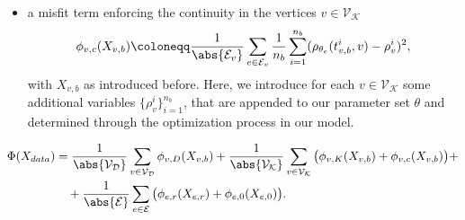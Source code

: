 \begin{itemize}
    \item a misfit term enforcing the continuity in the vertices $v \in \mathcal{V}_\mathcal{K}$ \begin{equation*} \phi_{v,c} (X_{v,b}) \coloneqq \frac{1}{\abs{\mathcal{E}_v}} \sum_{e \in \mathcal{E}_v} \frac{1}{n_b} \sum_{i=1}^{n_b} ( \rho_{\theta_e} (t_{v,b}^i, v) - \rho_{v}^i)^2, \end{equation*} with $X_{v,b}$ as introduced before. Here, we introduce for each $v \in \mathcal{V}_\mathcal{K}$ some additional variables $\{\rho_{v}^i\}_{i=1}^{n_b}$, that are appended to our parameter set $\theta$ and determined through the optimization process in our model.
\end{itemize}

\begin{align*} \label{eq:loss}
    \Phi(X_{data}) & =  \frac{1}{\abs{\mathcal{V}_\mathcal{D}}} \sum_{v \in \mathcal{V}_\mathcal{D}} \phi_{v,D}(X_{v,b}) + \frac{1}{\abs{\mathcal{V}_\mathcal{K}}} \sum_{v \in \mathcal{V}_\mathcal{K}} \big( \phi_{v,K} (X_{v,b}) + \phi_{v,c}(X_{v,b}) \big) + \\
    & \quad + \frac{1}{\abs{\mathcal{E}}} \sum_{e \in \mathcal{E}} \big( \phi_{e,r} (X_{e,r}) + \phi_{e,0} (X_{e,0}) \big). 
\end{align*}

